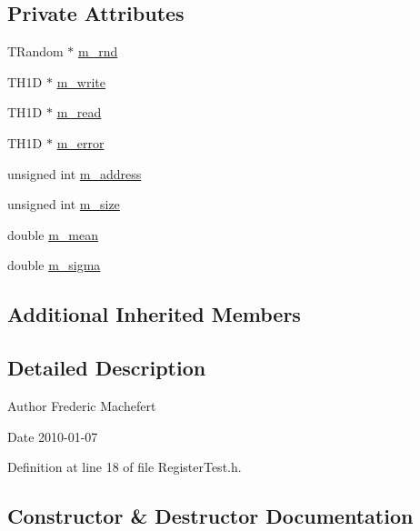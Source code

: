 \subsection*{Private Attributes}
\begin{DoxyCompactItemize}
\item 
T\+Random $\ast$ \hyperlink{classRegisterTest_a07e35817b07d61e54caa694d2a0fa210}{m\+\_\+rnd}
\item 
T\+H1D $\ast$ \hyperlink{classRegisterTest_a4e2dbc640871ece43a554425e2b73dcf}{m\+\_\+write}
\item 
T\+H1D $\ast$ \hyperlink{classRegisterTest_a5bb74853c26fdf7223244c569c64eb6d}{m\+\_\+read}
\item 
T\+H1D $\ast$ \hyperlink{classRegisterTest_a9b32a49463a1b1d319fde007607254f0}{m\+\_\+error}
\item 
unsigned int \hyperlink{classRegisterTest_a1a227f5fe12e8cfc284a904bb9f7e109}{m\+\_\+address}
\item 
unsigned int \hyperlink{classRegisterTest_ab543b709d593b4ae36c628c60da76923}{m\+\_\+size}
\item 
double \hyperlink{classRegisterTest_aba5ac8088017236617d2244fc0c261b9}{m\+\_\+mean}
\item 
double \hyperlink{classRegisterTest_a17f1f3646bf00ae7ab6744afca9e6813}{m\+\_\+sigma}
\end{DoxyCompactItemize}
\subsection*{Additional Inherited Members}


\subsection{Detailed Description}
\begin{DoxyAuthor}{Author}
Frederic Machefert 
\end{DoxyAuthor}
\begin{DoxyDate}{Date}
2010-\/01-\/07 
\end{DoxyDate}


Definition at line 18 of file Register\+Test.\+h.



\subsection{Constructor \& Destructor Documentation}
\mbox{\label{classRegisterTest_a0c77058c104d6249d884d864a4f61524}} 
